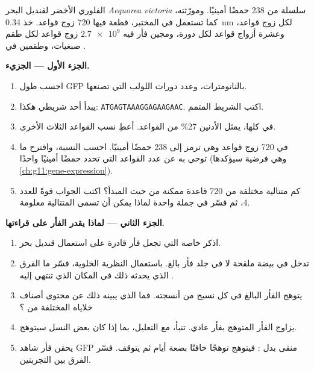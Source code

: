 \begin{problem}
\label{pb:g10:universal-dna:1}
 الفلوري الأخضر لقنديل البحر \emph{Aequorea victoria} سلسلة
من 238 حمضًا أمينيًا. ومورّثته، كما تستعمل في المختبر، قطعة  فيها
720 زوج قواعد. خذ \qty{0.34}{nm} لكل زوج قواعد، وعشرة أزواج قواعد لكل
دورة، ومجين فأر فيه $\num{2.7e9}$ زوج قواعد لكل طقم صبغيات، وطقمين في
.

\medskip
\noindent\textbf{الجزء الأول --- الجزيء.}
\begin{enumerate}
  \item احسب طول  GFP بالنانومترات، وعدد دورات اللولب التي
        تصنعها.
  \item يبدأ أحد شريطي  هكذا:
        \texttt{ATGAGTAAAGGAGAAGAAC}. اكتب الشريط المتمم.
  \item في  كلها، يمثل الأدنين 27\% من القواعد. أعطِ نسب
        القواعد الثلاث الأخرى.
  \item في  720 زوج قواعد وهي ترمز إلى 238 حمضًا أمينيًا. احسب
        النسبة، واقترح ما توحي به عن عدد القواعد التي تحدد حمضًا
        أمينيًا واحدًا (وهي فرضية سيؤكدها
        \cref{ch:g11:gene-expression}).
  \item كم متتالية مختلفة من 720 قاعدة ممكنة من حيث المبدأ؟ اكتب
        الجواب قوةً للعدد 4، ثم فسّر في جملة واحدة لماذا يمكن أن تسمى
        المتتالية معلومة.
\end{enumerate}

\medskip
\noindent\textbf{الجزء الثاني --- لماذا يقدر الفأر على قراءتها.}
\begin{enumerate}[resume]
  \item اذكر خاصة  التي تجعل  فأر قادرة على استعمال 
        قنديل بحر.
  \item تدخل  في بيضة ملقحة لا في جلد فأر بالغ. باستعمال
        النظرية الخلوية، فسّر ما الفرق الذي يحدثه ذلك في المكان الذي
        تنتهي إليه .
  \item يتوهج الفأر البالغ في كل نسيج من أنسجته. فما الذي يبينه ذلك
        عن محتوى أصناف خلاياه المختلفة من ؟
  \item يزاوج الفأر المتوهج بفأر عادي. تنبأ، مع التعليل، بما إذا كان
        بعض النسل سيتوهج.
  \item يحقن فأر شاهد  GFP منقى بدل : فيتوهج توهجًا
        خافتًا بضعة أيام ثم يتوقف. فسّر الفرق بين التجربتين.
\end{enumerate}


\end{problem}
